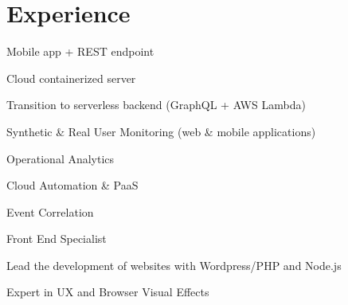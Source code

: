 \documentclass[letterpaper]{deedy-resume} %
\begin{document}
\hfill
%
%
\begin{minipage}[t]{0.66\textwidth} %


\section{Experience}


\vspace{\topsep} %
\begin{tightitemize}
\item Mobile app + REST endpoint
\item Cloud containerized server
\item Transition to serverless backend (GraphQL + AWS Lambda)
\end{tightitemize}

\sectionspace %


\begin{tightitemize}
\item Synthetic \& Real User Monitoring (web \& mobile applications)
\item Operational Analytics
\item Cloud Automation \& PaaS
\item Event Correlation
\end{tightitemize}

\sectionspace %


\begin{tightitemize}
\item Front End Specialist
\item Lead the development of websites with Wordpress/PHP and Node.js
\item Expert in UX and Browser Visual Effects
\end{tightitemize}


\end{minipage}
\end{document}
